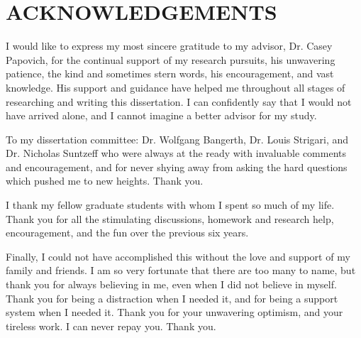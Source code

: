 %
%
%


\chapter*{ACKNOWLEDGEMENTS}


\indent 
I would like to express my most sincere gratitude to my advisor, Dr. Casey Papovich, for the continual support of my research pursuits, his unwavering patience, the kind and sometimes stern words, his encouragement, and vast knowledge. His support and guidance have helped me throughout all stages of researching and writing this dissertation. I can confidently say that I would not have arrived alone, and I cannot imagine a better advisor for my study.

To my dissertation committee: Dr. Wolfgang Bangerth, Dr. Louis Strigari, and Dr. Nicholas Suntzeff who were always at the ready with invaluable comments and encouragement, and for never shying away from asking the hard questions which pushed me to new heights. Thank you.

I thank my fellow graduate students with whom I spent so much of my life. Thank you for all the stimulating discussions, homework and research help, encouragement, and the fun over the previous six years.

Finally, I could not have accomplished this without the love and support of my family and friends. I am so very fortunate that there are too many to name, but thank you for always believing in me, even when I did not believe in myself. Thank you for being a distraction when I needed it, and for being a support system when I needed it. Thank you for your unwavering optimism, and your tireless work. I can never repay you. Thank you.
\pagebreak{}